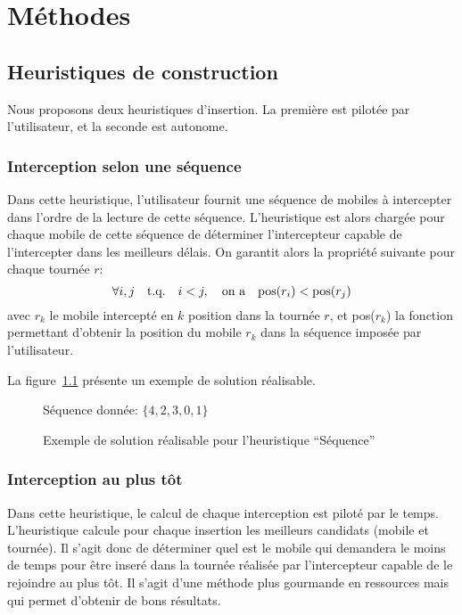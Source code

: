 \chapter{Méthodes}
    \section{Heuristiques de construction}
		Nous proposons deux heuristiques d'insertion. La première est pilotée par l'utilisateur, et la seconde est autonome.
		\subsection{Interception selon une séquence}
		\label{sub:heuristic_sequence}
			Dans cette heuristique, l'utilisateur fournit une séquence de mobiles à intercepter dans l'ordre de la lecture de cette séquence. L'heuristique est alors chargée pour chaque mobile de cette séquence de déterminer l'intercepteur capable de l'intercepter dans les meilleurs délais. On garantit alors la propriété suivante pour chaque tournée $r$:
			\[
				\forall i, j \qtext{t.q.}  i<j, \qtext{on a} \text{pos}(r_i) < \text{pos}(r_j)
			\]
			avec $r_k$ le mobile intercepté en $k$\ieme{} position dans la tournée $r$, et pos($r_k$) la fonction permettant d'obtenir la position du mobile $r_k$ dans la séquence imposée par l'utilisateur.

			La figure~\ref{fig:heuristic_sequence_demo} présente un exemple de solution réalisable.

			\begin{figure}[h!]
			\centering
			Séquence donnée: $\{4, 2, 3, 0, 1\}$

			\begin{tikzpicture}[schema]
				
			\end{tikzpicture}
			\caption{Exemple de solution réalisable pour l'heuristique ``Séquence''}
			\label{fig:heuristic_sequence_demo}
			\end{figure}

		\subsection{Interception au plus tôt}
		\label{sub:heuristic_fastest}
			Dans cette heuristique, le calcul de chaque interception est piloté par le temps. L'heuristique calcule pour chaque insertion les meilleurs candidats (mobile et tournée). Il s'agit donc de déterminer quel est le mobile qui demandera le moins de temps pour être inseré dans la tournée réalisée par l'intercepteur capable de le rejoindre au plus tôt. Il s'agit d'une méthode plus gourmande en ressources mais qui permet d'obtenir de bons résultats.


